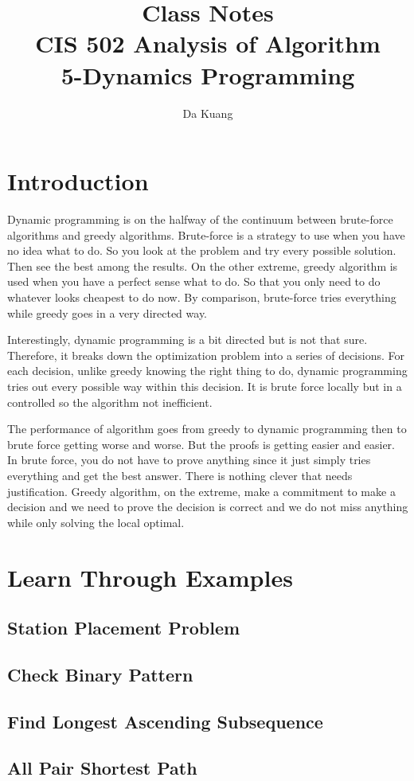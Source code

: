 \documentclass[en,hazy,blue,screen,14pt]{elegantnote}
\title{Class Notes\\CIS 502 Analysis of Algorithm\\5-Dynamics Programming}
\author{Da Kuang}
\institute{University of Pennsylvania}
\date{}
\begin{document}
\maketitle
\newpage
% 
\section{Introduction}
Dynamic programming is on the halfway of the continuum between brute-force algorithms and greedy algorithms. Brute-force is a strategy to use when you have no idea what to do. So you look at the problem and try every possible solution. Then see the best among the results. On the other extreme, greedy algorithm is used when you have a perfect sense what to do. So that you only need to do whatever looks cheapest to do now. By comparison, brute-force tries everything while greedy goes in a very directed way.

Interestingly, dynamic programming is a bit directed but is not that sure. Therefore, it breaks down the optimization problem into a series of decisions. For each decision, unlike greedy knowing the right thing to do, dynamic programming tries out every possible way within this decision. It is brute force locally but in a controlled so the algorithm not inefficient.

The performance of algorithm goes from greedy to dynamic programming then to brute force getting worse and worse. But the proofs is getting easier and easier. In brute force, you do not have to prove anything since it just simply tries everything and get the best answer. There is nothing clever that needs justification. Greedy algorithm, on the extreme, make a commitment to make a decision and we need to prove the decision is correct and we do not miss anything while only solving the local optimal.

\section{Learn Through Examples}
\subsection{Station Placement Problem}


\subsection{Check Binary Pattern}


\subsection{Find Longest Ascending Subsequence}


\subsection{All Pair Shortest Path}

\end{document}
